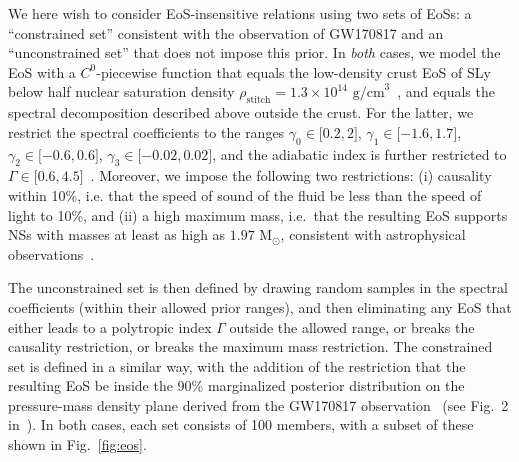 \documentclass[prd,twocolumn,nofootinbib,superscriptaddress,amsmath,amssymb]{revtex4-1}
\begin{document}
We here wish to consider EoS-insensitive relations using two sets of EoSs: a ``constrained set'' consistent with the observation of GW170817 and an ``unconstrained set'' that does not impose this prior. In \emph{both} cases, we model the EoS with a $C^{0}$-piecewise function that equals the low-density crust EoS of SLy~\cite{Douchin:2001sv} below half nuclear saturation density $\rho_{\text{stitch}}=1.3 \times 10^{14} \text{ g/cm}^3$~\cite{Read2009}, and equals the spectral decomposition described above outside the crust. For the latter, we restrict the spectral coefficients to the ranges $\gamma_0 \in \lbrack 0.2,2 \rbrack$, $\gamma_1 \in \lbrack -1.6,1.7 \rbrack$, $\gamma_2 \in \lbrack -0.6,0.6 \rbrack$, $\gamma_3 \in \lbrack -0.02,0.02 \rbrack$, and the adiabatic index is further restricted to $\Gamma \in \lbrack 0.6,4.5 \rbrack$~\cite{Lindblom:parameters}. Moreover, we impose the following two restrictions:  (i) causality within 10\%, i.e. that the speed of sound of the fluid be less than the speed of light to 10\%, and (ii) a high maximum mass, i.e.~that the resulting EoS supports NSs with masses at least as high as $1.97 \text{ M}_{\odot}$, consistent with astrophysical observations~\cite{Zhao:massiveNS}. 

The unconstrained set is then defined by drawing random samples in the spectral coefficients (within their allowed prior ranges), and then eliminating any EoS that either leads to a polytropic index $\Gamma$ outside the allowed range, or breaks the causality restriction, or breaks the maximum mass restriction. The constrained set is defined in a similar way, with the addition of the restriction that the resulting EoS be inside the 90\% marginalized posterior distribution on the pressure-mass density plane derived from the GW170817 observation~\cite{LIGO:posterior,Carney:2018sdv}  (see Fig.~2 in~\cite{LIGO:posterior}). In both cases, each set consists of 100 members, with a subset of these shown in Fig.~\ref{fig:eos}.
\end{document}
